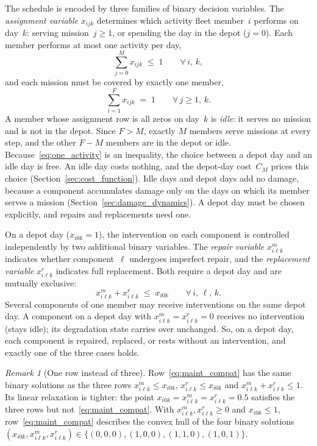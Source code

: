 \documentclass[11pt,a4paper]{article}
\theoremstyle{plain}
\theoremstyle{definition}
\theoremstyle{remark}
\newtheorem{remark}[theorem]{Remark}
\begin{document}
The schedule is encoded by three families of binary decision variables.
The \emph{assignment variable} $x_{ijk}$ determines which activity fleet member~$i$ performs on day~$k$: serving mission~$j \ge 1$, or spending the day in the depot ($j=0$).
Each member performs at most one activity per day,
\begin{equation}\label{eq:one_activity}
  \sum_{j=0}^{M} x_{ijk} \;\le\; 1 \qquad \forall\, i,\,k,
\end{equation}
and each mission must be covered by exactly one member,
\begin{equation}\label{eq:mission_coverage}
  \sum_{i=1}^{F} x_{ijk} \;=\; 1 \qquad \forall\, j \ge 1,\,k.
\end{equation}
A member whose assignment row is all zeros on day~$k$ is \emph{idle}: it serves no mission and is not in the depot.
Since $F > M$, exactly $M$ members serve missions at every step, and the other $F - M$ members are in the depot or idle.
Because~\eqref{eq:one_activity} is an inequality, the choice between a depot day and an idle day is free.
An idle day costs nothing, and the depot-day cost~$C_M$ prices this choice (Section~\ref{sec:cost_function}).
Idle days and depot days add no damage, because a component accumulates damage only on the days on which its member serves a mission (Section~\ref{sec:damage_dynamics}).
A depot day must be chosen explicitly, and repairs and replacements need one.

On a depot day ($x_{i0k}=1$), the intervention on each component is controlled independently by two additional binary variables.
The \emph{repair variable} $x^m_{i\ell k}$ indicates whether component~$\ell$ undergoes imperfect repair, and the \emph{replacement variable} $x^r_{i\ell k}$ indicates full replacement.
Both require a depot day and are mutually exclusive:
\begin{equation}\label{eq:maint_compat}
  x^m_{i\ell k} + x^r_{i\ell k} \;\le\; x_{i0k}
  \qquad \forall\, i,\,\ell,\,k.
\end{equation}
Several components of one member may receive interventions on the same depot day.
A component on a depot day with $x^m_{i\ell k} = x^r_{i\ell k} = 0$ receives no intervention (stays idle); its degradation state carries over unchanged.
So, on a depot day, each component is repaired, replaced, or rests without an intervention, and exactly one of the three cases holds.

\begin{remark}[One row instead of three]\label{rem:one_depot_row}
Row~\eqref{eq:maint_compat} has the same binary solutions as the three rows $x^m_{i\ell k} \le x_{i0k}$, $x^r_{i\ell k} \le x_{i0k}$ and $x^m_{i\ell k} + x^r_{i\ell k} \le 1$.
Its linear relaxation is tighter: the point $x_{i0k} = x^m_{i\ell k} = x^r_{i\ell k} = 0.5$ satisfies the three rows but not~\eqref{eq:maint_compat}.
With $x^m_{i\ell k}, x^r_{i\ell k} \ge 0$ and $x_{i0k} \le 1$, row~\eqref{eq:maint_compat} describes the convex hull of the four binary solutions $(x_{i0k}, x^m_{i\ell k}, x^r_{i\ell k}) \in \{(0,0,0), (1,0,0), (1,1,0), (1,0,1)\}$.
\end{remark}
\end{document}
